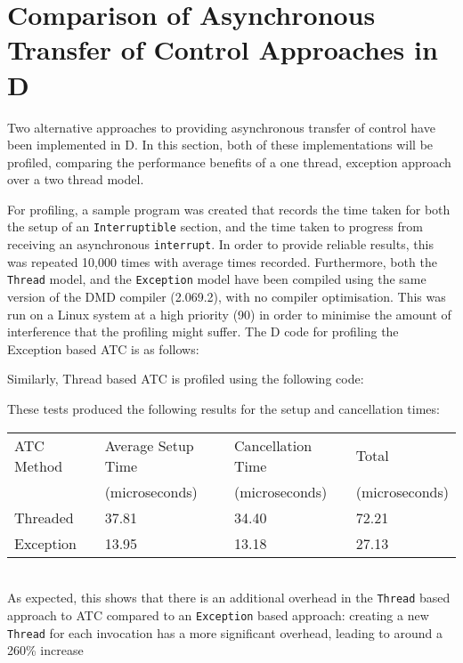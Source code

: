 \section{Comparison of Asynchronous Transfer of Control Approaches in D}
Two alternative approaches to providing asynchronous transfer of control
have been implemented in D. In this section, both of these implementations will 
be profiled, comparing the performance benefits of a one thread, exception approach over a 
two thread model. 
\par\bigskip\noindent
For profiling, a sample program was created that records the
time taken for both the setup of an \texttt{Interruptible} section, and the time 
taken to progress from receiving an asynchronous \texttt{interrupt}. In order to 
provide reliable results,
this was repeated 10,000 times with average times recorded. Furthermore, both
the \texttt{Thread} model, and the \texttt{Exception} model have been compiled 
using the same version of the DMD compiler (2.069.2), with no compiler
optimisation. This was run on a Linux system at a high
priority (90) in order to minimise the amount of interference that the
profiling might suffer. 
The D code for profiling the Exception based ATC is as follows: 

Similarly, Thread based ATC is profiled using the following code: 

These tests produced the following results for the setup and cancellation times: 
\begin{table}[!htbp]
\begin{tabular}{l|lll}
ATC Method & Average Setup Time & Cancellation Time  & Total          \\
           & (microseconds)     & (microseconds)     & (microseconds) \\ \hline
Threaded   & 37.81              & 34.40              & 72.21          \\
Exception  & 13.95              & 13.18              & 27.13          \\
\end{tabular}
\end{table} \\
As expected, this shows that there is an additional overhead in the
\texttt{Thread} based approach to ATC compared to an \texttt{Exception} based
approach: creating a new \texttt{Thread} for each
invocation has a more significant overhead, leading to around a 260\% increase 
